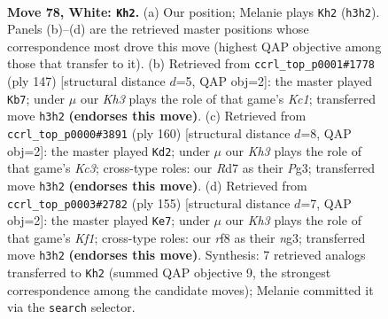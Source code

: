 \documentclass[11pt]{article}
\begin{document}
\clearpage

\begin{figure}[p]\centering
\begin{subfigure}{0.46\textwidth}\centering
\resizebox{\linewidth}{!}{%
\newchessgame
\chessboard[
  setfen={5r1k/P2R4/8/8/8/7K/8/8 w - - 25 78},
  showmover=false,
  pgfstyle=straightmove, color=movearrow, markmove={h3-h2}
]}
\caption{}
\end{subfigure}\hfill
\begin{subfigure}{0.46\textwidth}\centering
\resizebox{\linewidth}{!}{%
\newchessgame
\chessboard[
  setfen={2k5/p7/8/8/8/2N5/5K1R/r7 b - - 0 74},
  showmover=false,
  pgfstyle=straightmove, color=movearrow, markmove={c8-b7}
]}
\caption{}
\end{subfigure}
\\[4pt]
\begin{subfigure}{0.46\textwidth}\centering
\resizebox{\linewidth}{!}{%
\newchessgame
\chessboard[
  setfen={2R5/7r/8/5p1k/8/2K3P1/8/8 w - - 9 81},
  showmover=false,
  pgfstyle=straightmove, color=movearrow, markmove={c3-d2}
]}
\caption{}
\end{subfigure}\hfill
\begin{subfigure}{0.46\textwidth}\centering
\resizebox{\linewidth}{!}{%
\newchessgame
\chessboard[
  setfen={5k2/8/8/1R5K/8/p5N1/8/r7 b - - 6 78},
  showmover=false,
  pgfstyle=straightmove, color=movearrow, markmove={f8-e7}
]}
\caption{}
\end{subfigure}
\caption{\textbf{Move 78, White: \texttt{Kh2}.} (a) Our position; Melanie plays \texttt{Kh2} (\texttt{h3h2}). Panels (b)--(d) are the retrieved master positions whose correspondence most drove this move (highest QAP objective among those that transfer to it). (b) Retrieved from \texttt{ccrl\_top\_p0001\#1778} (ply 147) [structural distance $d$=5, QAP obj=2]: the master played \texttt{Kb7}; under $\mu$ our \emph{Kh3} plays the role of that game's \emph{Kc1}; transferred move \texttt{h3h2} \textbf{(endorses this move)}. (c) Retrieved from \texttt{ccrl\_top\_p0000\#3891} (ply 160) [structural distance $d$=8, QAP obj=2]: the master played \texttt{Kd2}; under $\mu$ our \emph{Kh3} plays the role of that game's \emph{Kc3}; cross-type roles: our \emph{R}d7 as their \emph{P}g3; transferred move \texttt{h3h2} \textbf{(endorses this move)}. (d) Retrieved from \texttt{ccrl\_top\_p0003\#2782} (ply 155) [structural distance $d$=7, QAP obj=2]: the master played \texttt{Ke7}; under $\mu$ our \emph{Kh3} plays the role of that game's \emph{Kf1}; cross-type roles: our \emph{r}f8 as their \emph{n}g3; transferred move \texttt{h3h2} \textbf{(endorses this move)}. Synthesis: 7 retrieved analogs transferred to \texttt{Kh2} (summed QAP objective 9, the strongest correspondence among the candidate moves); Melanie committed it via the \texttt{search} selector.}
\label{fig:thought-m154}
\end{figure}
\end{document}
